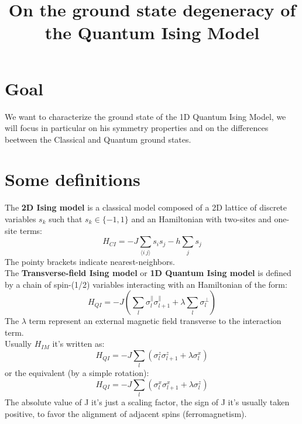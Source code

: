 \documentclass[12pt,a4paper]{article}
\title{On the ground state degeneracy of the Quantum Ising Model}
\author{}
\begin{document}
	\maketitle
\section{Goal}
We want to characterize the ground state of the 1D Quantum Ising Model, we will focus in particular on his symmetry properties and on the differences beetween the Classical and Quantum ground states.
\section{Some definitions}
The \textbf{2D Ising model} is a classical model composed of a 2D lattice of discrete variables $s_k$ such that  $s_k \in \{-1,1 \}$ and an Hamiltonian with two-sites and one-site terms:
\begin{equation}\label{eq:hamiltclass}
H_{CI}=-J\sum _{\langle i~j\rangle }s _{i}s _{j}-h\sum _{j}s _{j}
\end{equation}
The pointy brackets indicate nearest-neighbors. \\
The \textbf{Transverse-field Ising model} or \textbf{1D Quantum Ising model} \cite{sachdev_2011} is defined by a chain of spin-(1/2) variables interacting with an Hamiltonian of the form:
\begin{equation}\label{eq:hamiltqi}
H_{QI}=-J(\sum _{ l }\sigma_{l}^\parallel\sigma_{l+1}^\parallel+\lambda\sum _{l}\sigma_{l}^\perp)
\end{equation}
The $\lambda$ term represent an external magnetic field transverse to the interaction term.\\
Usually $H_{IM}$ it's written as:
\begin{equation}\label{eq:hamilt}
	H_{QI}=-J \sum_{l}\left(\sigma_{l}^{z} \sigma_{l+1}^{z}+\lambda\sigma_{l}^{x}\right)	
\end{equation}
or the equivalent (by a simple rotation):
\begin{equation}
	H_{QI}=-J \sum_{l}\left(\sigma_{l}^{x} \sigma_{l+1}^{x}+\lambda\sigma_{l}^{z}\right)
\end{equation}
The absolute value of J it's just a scaling factor, the sign of J it's usually taken positive, to favor the alignment of adjacent spins (ferromagnetism).
\end{document}

